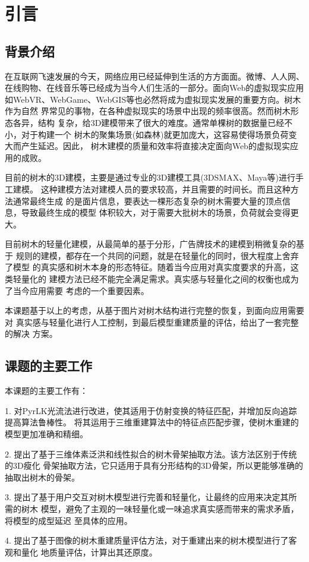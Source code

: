



\chapter{引言}
\label{cha:intro}
\section{背景介绍}
\label{sec:background}
在互联网飞速发展的今天，网络应用已经延伸到生活的方方面面。微博、人人网、
在线购物、在线音乐等已经成为当今人们生活的一部分。面向Web的虚拟现实应用
如WebVR、WebGame、WebGIS等也必然将成为虚拟现实发展的重要方向。树木作为自然
界常见的事物，在各种虚拟现实的场景中出现的频率很高。然而树木形态各异，结构
复杂，给3D建模带来了很大的难度。通常单棵树的数据量已经不小，对于构建一个
树木的聚集场景(如森林)就更加庞大，这容易使得场景负荷变大而产生延迟。因此，
树木建模的质量和效率将直接决定面向Web的虚拟现实应用的成败。

目前的树木的3D建模，主要是通过专业的3D建模工具(3DSMAX、Maya等)进行手工建模。
这种建模方法对建模人员的要求较高，并且需要的时间长。而且这种方法通常最终生成
的是面片信息，要表达一棵形态复杂的树木需要大量的顶点信息，导致最终生成的模型
体积较大，对于需要大批树木的场景，负荷就会变得更大。

目前树木的轻量化建模，从最简单的基于分形，广告牌技术的建模到稍微复杂的基于
规则的建模，都存在一个共同的问题，就是在轻量化的同时，很大程度上舍弃了模型
的真实感和树木本身的形态特征。随着当今应用对真实度要求的升高，这类轻量化的
建模方法已经不能完全满足需求。真实感与轻量化之间的权衡也成为了当今应用需要
考虑的一个重要因素。

本课题基于以上的考虑，从基于图片对树木结构进行完整的恢复，到面向应用需要对
真实感与轻量化进行人工控制，到最后模型重建质量的评估，给出了一套完整的解决
方案。

\section{课题的主要工作}
\label{sec:objective}
本课题的主要工作有：

1. 对PyrLK光流法进行改进，使其适用于仿射变换的特征匹配，并增加反向追踪提高算法鲁棒性。
将其运用于三维重建算法中的特征点匹配步骤，使树木重建的模型更加准确和精细。

2. 提出了基于三维体素泛洪和线性拟合的树木骨架抽取方法。该方法区别于传统的3D瘦化
骨架抽取方法，它只适用于具有分形结构的3D骨架，所以更能够准确的抽取出树木的骨架。

3. 提出了基于用户交互对树木模型进行完善和轻量化，让最终的应用来决定其所需的树木
模型，避免了主观的一味轻量化或一味追求真实感而带来的需求矛盾，将模型的成型延迟
至具体的应用。

4. 提出了基于图像的树木重建质量评估方法，对于重建出来的树木模型进行了客观和量化
地质量评估，计算出其还原度。
